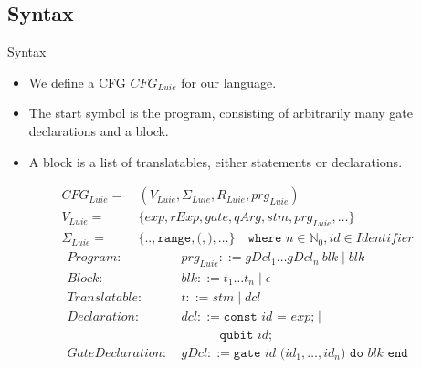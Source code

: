 \subsection{Syntax}
\begin{frame}{Syntax}
    \begin{itemize}
        \item We define a CFG $CFG_{Luie}$ for our language.
        \item The start symbol is the program, consisting of arbitrarily many gate declarations and a block.
        \item A block is a list of translatables, either statements or declarations.
    \end{itemize}
    \begin{align*}
        CFG_{Luie} = \ & (V_{Luie}, \Sigma_{Luie}, R_{Luie}, prg_{Luie} )\\ 
        V_{Luie} = \ & \{ exp, rExp, gate,  qArg, stm, prg_{Luie}, \dots \}\\ 
        \Sigma_{Luie} = \ & \{\texttt{..}, \texttt{range}, \texttt{(}, \texttt{)}, \dots \} 
        \quad \texttt{where } n \in \mathbb{N}_0, id \in Identifier
    \end{align*}
    \vspace{\alignmargin}
    \begin{align*}
        Program: \ & prg_{Luie} ::= gDcl_1 \dots gDcl_n \ blk \mid blk \\
        Block: \ & blk::= t_1 \dots t_n \mid \epsilon\\
        Translatable : \ & t::= stm \mid dcl\\
        Declaration: \ & dcl ::= \texttt{const } id \texttt{ = } exp \texttt{;} \mid \\
                     & \quad \quad \quad \texttt{qubit } id \texttt{;}\\
        GateDeclaration: \ & gDcl::= \texttt{gate } id \texttt{ (}id_1, \dots, id_n\texttt{) do } blk \texttt{ end}
    \end{align*}
\end{frame}

